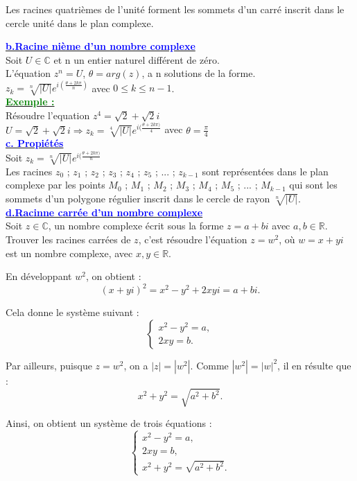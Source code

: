 \documentclass[12pt,a4paper]{article}
\newcounter{exemple} %
\newcommand{\exemple}{%
  \refstepcounter{exemple}%
  \textbf{\textcolor{green}{Exemple \theexemple :}} \ignorespaces
}
\begin{document}
Les racines quatrièmes de l'unité forment les sommets d'un carré inscrit dans le cercle unité dans le plan complexe.

\underline{\textbf{\textcolor{blue}{b.Racine nième d'un nombre complexe}}}\\
Soit $U \in \mathbb{C}$ et n un entier naturel différent de zéro.\\
L'équation $z^{n}=U$, $\theta=arg(z)$, a n solutions de la forme.\\
$z_{k}=\sqrt[n]{|U|}e^{i(\frac{\theta+2k\pi}{n})}$ avec $ 0\leq k \leq n-1 $.\\
\underline{\exemple}\\
Résoudre l'equation $z^{4}=\sqrt{2}+\sqrt{2}i$\\
$U=\sqrt{2}+\sqrt{2}i \Longrightarrow z_{k}=\sqrt[4]{|U|}e^{i(\frac{\theta+2k\pi)}{4}}$ avec 
$\theta=\frac{\pi}{4}$\\
\underline{\textbf{\textcolor{blue}{c. Propiétés}}}\\
Soit $z_{k}=\sqrt[n]{|U|}e^{i(\frac{\theta+2k\pi)}{n}}$\\
Les racines $z_{0}$ ; $z_{1}$ ; $z_{2}$ ; $z_{3}$ ; $z_{4}$ ; $z_{5}$ ; ... ; $z_{k-1}$ sont représentées dans le plan complexe par les points $M_{0}$ ; $M_{1}$ ; $M_{2}$ ; $M_{3}$ ; $M_{4}$ ; $M_{5}$ ; ... ; $M_{k-1}$ qui sont les sommets d’un polygone régulier inscrit dans le cercle de rayon $\sqrt[n]{|U|}$.\\
\underline{\textbf{\textcolor{blue}{d.Racinne carrée d'un nombre complexe}}}\\
Soit \( z \in \mathbb{C} \), un nombre complexe écrit sous la forme \( z = a + bi \) avec \( a, b \in \mathbb{R} \).  
Trouver les racines carrées de \( z \), c'est résoudre l'équation \( z = w^2  \), où \( w = x + yi \) est un nombre complexe, avec \( x, y \in \mathbb{R} \).  

En développant \( w^2 \), on obtient :  
\[
(x + yi)^2 = x^2 - y^2 + 2xyi = a + bi.
\]

Cela donne le système suivant :
\[
\begin{cases}
x^2 - y^2 = a, \\
2xy = b.
\end{cases}
\]

Par ailleurs, puisque \( z = w^2 \), on a \( |z| = |w^2| \). Comme \( |w^2| = |w|^2 \), il en résulte que :  
\[
x^2 + y^2 = \sqrt{a^2 + b^2}.
\]

Ainsi, on obtient un système de trois équations :  
\[
\begin{cases}
x^2 - y^2 = a, \\
2xy = b, \\
x^2 + y^2 = \sqrt{a^2 + b^2}.
\end{cases}
\]
\end{document}
